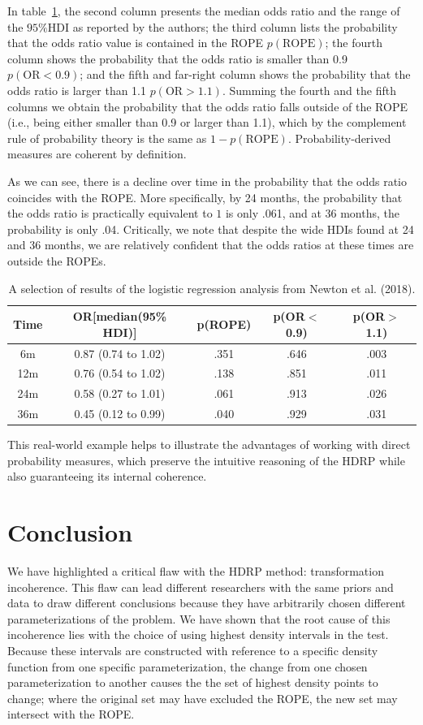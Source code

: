 \documentclass[man]{apa}
\newcommand{\hdr}{HDRP}
\begin{document}
In table~\ref{tab:newton}, the second column presents the median odds ratio and the range of the $95\% \text{HDI}$ as reported by the authors; the third column lists the probability that the odds ratio value is contained in the ROPE $p(\text{ROPE})$; the fourth column shows the probability that the odds ratio is smaller than 0.9 $p(\text{OR}<0.9)$; and the fifth and far-right column shows the probability that the odds ratio is larger than 1.1 $p(\text{OR}>1.1)$. Summing the fourth and the fifth columns we obtain the probability that the odds ratio falls outside of the ROPE (i.e., being either smaller than 0.9 or larger than 1.1), which by the complement rule of probability theory is the same as $1-p(\text{ROPE})$. Probability-derived measures are coherent by definition. 

As we can see, there is a decline over time in the probability that the odds ratio coincides with the ROPE. More specifically, by 24 months, the probability that the odds ratio is practically equivalent to $1$ is only .061, and at 36 months, the probability is only .04. Critically, we note that despite the wide HDIs found at 24 and 36 months, we are relatively confident that the odds ratios at these times are outside the ROPEs.


\begin{table}
\caption{A selection of results of the logistic regression analysis from Newton et al. (2018).}\label{tab:newton}
\begin{tabular}{ccccc}\hline
    Time & OR[median(95\% HDI)] & p(ROPE) & p(OR$<$0.9) & p(OR$>$1.1)  \\\hline
   6m  & 0.87 (0.74 to 1.02) & .351 & .646 & .003\\
   12m & 0.76 (0.54 to 1.02) & .138 & .851 & .011\\
   24m & 0.58 (0.27 to 1.01) & .061 & .913 & .026\\
   36m & 0.45 (0.12 to 0.99) & .040 & .929 & .031\\\hline
\end{tabular}
\end{table}

This real-world example helps to illustrate the advantages of working with direct probability measures, which preserve the intuitive reasoning of the \hdr{} while also guaranteeing its internal coherence.
 
\section*{Conclusion}
We have highlighted a critical flaw with the \hdr{} method: transformation incoherence. This flaw can lead different researchers with the same priors and data to draw different conclusions because they have arbitrarily chosen different parameterizations of the problem. We have shown that the root cause of this incoherence lies with the choice of using highest density intervals in the test. Because these intervals are constructed with reference to a specific density function from one specific parameterization, the change from one chosen parameterization to another causes the the set of highest density points to change; where the original set may have excluded the ROPE, the new set may intersect with the ROPE. 
\end{document}
